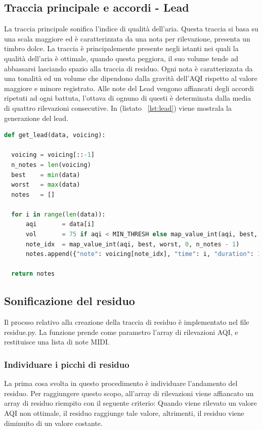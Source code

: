 \subsection{Traccia principale e accordi - Lead}
La traccia principale sonifica l'indice di qualità dell'aria.
Questa traccia si basa su una scala maggiore ed è caratterizzata da una nota per rilevazione, presenta un timbro dolce.
La traccia è principalemente presente negli istanti nei quali la qualità dell'aria è ottimale, quando questa peggiora,
il suo volume tende ad abbassarsi lasciando spazio alla traccia di residuo.
Ogni nota è caratterizzata da una tonalità ed un volume che dipendono dalla gravità dell'AQI rispetto al valore maggiore e minore registrato.
Alle note del Lead vengono affiancati degli accordi ripetuti ad ogni battuta, l'ottava di ognuno di questi è determinata dalla media di quattro rilevazioni consecutive. In (listato ~\ref{lst:lead}) viene mostrala la generazione del lead.

\begin{lstlisting}[language=Python,caption={Generazione della traccia principale.},label={lst:lead}]
def get_lead(data, voicing):

  voicing = voicing[::-1]
  n_notes = len(voicing)
  best    = min(data)
  worst   = max(data)
  notes   = []

  for i in range(len(data)):
      aqi       = data[i]
      vol       = 75 if aqi < MIN_THRESH else map_value_int(aqi, best, worst, 50, 25)
      note_idx  = map_value_int(aqi, best, worst, 0, n_notes - 1)
      notes.append({"note": voicing[note_idx], "time": i, "duration": 1, "volume": vol })

  return notes

\end{lstlisting}

\newpage

\subsection{Sonificazione del residuo}
Il procsso relativo alla creazione della traccia di residuo è implementato nel file residue.py.
La funzione prende come parametro l'array di rilevazioni AQI, e restituisce una lista di note MIDI.
\subsubsection{Individuare i picchi di residuo}
La prima cosa svolta in questo procedimento è individuare l'andamento del residuo.
Per raggiungere questo scopo, all'array di rilevazioni viene affiancato un array di residuo riempito con il seguente criterio:
Quando viene rilevato un valore AQI non ottimale, il residuo raggiunge tale valore, altrimenti, il residuo viene diminuito di un valore costante.
